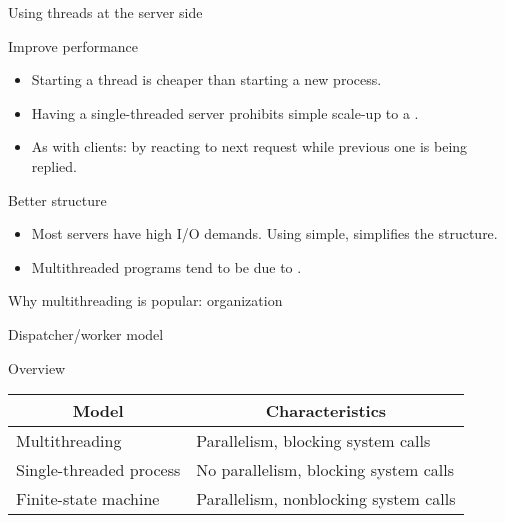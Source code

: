 \begin{slide}{Using threads at the server side}
  \begin{block}{Improve performance}
    \begin{itemize}\tightlist
    \item Starting a thread is cheaper than starting a new process.
    \item Having a single-threaded server prohibits simple scale-up to a .
    \item As with clients:  by reacting to next request while previous one is being replied.
    \end{itemize}
  \end{block}
  \begin{block}{Better structure}
    \begin{itemize}\tightlist
    \item Most servers have high I/O demands. Using simple,  simplifies
      the structure.
    \item Multithreaded programs tend to be  due to .
    \end{itemize}
  \end{block}
\end{slide}
\begin{slide}{Why multithreading is popular: organization}
  \begin{block}{Dispatcher/worker model}
    \begin{center}
    \end{center}
  \end{block}
  \begin{block}{Overview}
    \begin{center}
      \begin{tabular}{|l|l|}\hline
        \multicolumn{1}{|c|}{\textbf{Model}} &  \multicolumn{1}{c|}{\textbf{Characteristics}} \\ \hline
        Multithreading          & Parallelism, blocking system calls \\ \hline
        Single-threaded process & No parallelism, blocking system calls \\ \hline
        Finite-state machine    & Parallelism, nonblocking system calls \\ \hline
      \end{tabular}
    \end{center}
  \end{block}
\end{slide}
